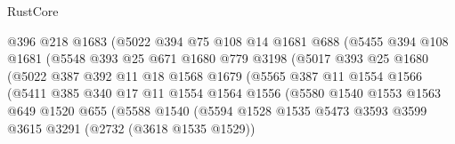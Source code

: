 \begin{lexlean}{RustCore}
\begin{coremodule}
                          @396
                          @218
                          @1683
                          (@5022
                            @394
                            @75
                            @108
                            @14
                            @1681
                            @688
                            (@5455
                              @394
                              @108
                              @1681
                              (@5548
                                @393
                                @25
                                @671
                                @1680
                                @779
                                @3198
                                (@5017
                                  @393
                                  @25
                                  @1680
                                  (@5022
                                    @387
                                    @392
                                    @11
                                    @18
                                    @1568
                                    @1679
                                    (@5565
                                      @387
                                      @11
                                      @1554
                                      @1566
                                      (@5411
                                        @385
                                        @340
                                        @17
                                        @11
                                        @1554
                                        @1564
                                        @1556
                                        (@5580
                                          @1540
                                          @1553
                                          @1563
                                          @649
                                          @1520
                                          @655
                                          (@5588
                                            @1540
                                            (@5594
                                              @1528
                                              @1535
                                              @5473
                                              @3593
                                              @3599
                                              @3615
                                              @3291
                                              (@2732 (@3618 @1535 @1529))

\end{coremodule}
\end{lexlean}
